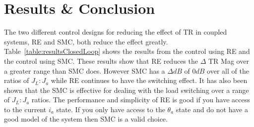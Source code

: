  \section{Results \& Conclusion}\label{sec:con}
% 
The two different control designs for reducing the effect of TR in coupled systems, RE and SMC, both
reduce the effect greatly. Table~\ref{table:resultsClosedLoop} shows the results from the control using RE 
and the control using SMC. These results show that RE reduces the $\Delta$ TR Mag over a
greater range than SMC does. However SMC has a $\Delta dB$ of $0dB$ over all of the ratios of $J_L:J_a$ while RE
continues to have the switching effect. It has also been shown that the SMC is effective for dealing with the load switching over a range of $J_L:J_a$ ratios.  The performance and simplicity of RE is good if you have access to the current $i_a$ state. If you only have access to the $\theta_a$ state and do not have a good model of the system then SMC is a valid choice.
 
 
 